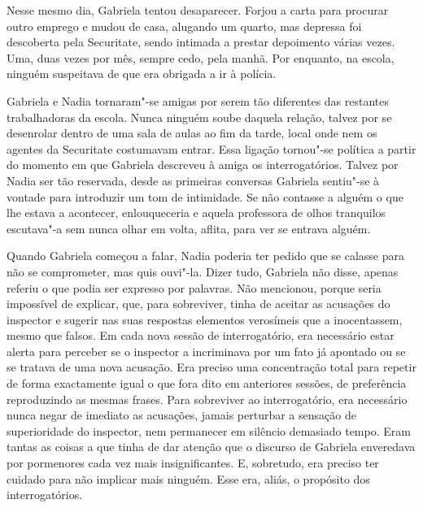 Nesse mesmo dia, Gabriela tentou desaparecer. Forjou a carta para
procurar outro emprego e mudou de casa, alugando um quarto, mas depressa
foi descoberta pela Securitate, sendo intimada a prestar depoimento
várias vezes. Uma, duas vezes por mês, sempre cedo, pela manhã. Por
enquanto, na escola, ninguém suspeitava de que era obrigada a ir à
polícia.

Gabriela e Nadia tornaram"-se amigas por serem tão diferentes das
restantes trabalhadoras da escola. Nunca ninguém soube daquela relação,
talvez por se desenrolar dentro de uma sala de aulas ao fim da tarde,
local onde nem os agentes da Securitate costumavam entrar. Essa ligação
tornou"-se política a partir do momento em que Gabriela descreveu à amiga
os interrogatórios. Talvez por Nadia ser tão reservada, desde as
primeiras conversas Gabriela sentiu"-se à vontade para introduzir um tom de intimidade. Se não contasse a
alguém o que lhe estava a acontecer, enlouqueceria e aquela professora
de olhos tranquilos escutava"-a sem nunca olhar em volta, aflita, para
ver se entrava alguém.

Quando Gabriela começou a falar, Nadia poderia ter pedido que se calasse
para não se comprometer, mas quis ouvi"-la. Dizer tudo, Gabriela não
disse, apenas referiu o que
podia ser expresso por palavras. Não mencionou, porque seria impossível
de explicar, que, para sobreviver, tinha de aceitar as acusações do
inspector e sugerir nas suas respostas elementos verosímeis que a
inocentassem, mesmo que falsos. Em cada nova sessão de interrogatório,
era necessário estar alerta para perceber se o inspector a incriminava
por um fato já apontado ou se se tratava de uma nova acusação. Era
preciso uma concentração total para repetir de forma exactamente igual o
que fora dito em anteriores sessões, de preferência reproduzindo as
mesmas frases. Para sobreviver ao interrogatório, era necessário nunca
negar de imediato as acusações, jamais perturbar a sensação de
superioridade do inspector, nem permanecer em silêncio demasiado tempo.
Eram tantas as coisas a que tinha de dar atenção que o discurso de
Gabriela enveredava por pormenores cada vez mais insignificantes. E,
sobretudo, era preciso ter cuidado para não implicar mais ninguém.
Esse era, aliás, o propósito dos interrogatórios.

